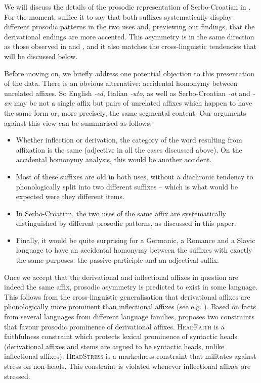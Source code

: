 \documentclass[output=paper]{langsci/langscibook}
\begin{document}
\noindent We will discuss the details of the prosodic representation of Serbo-Croatian in  . For the moment, suffice it to say that both suffixes systematically display different prosodic patterns in the two uses and, previewing our findings, that the derivational endings are more accented. This asymmetry is in the same direction as those observed in \citet{Mar2002} and \citet{Arsim2013}, and it also matches the cross-linguistic tendencies that will be discussed below.

Before moving on, we briefly address one potential objection to this presentation of the data. There is an obvious alternative: accidental homonymy between unrelated affixes. So English \textit{-ed}, Italian \textit{-uto}, as well as Serbo-Croatian \textit{-at} and \textit{-an} may be not a single affix but pairs of unrelated affixes which happen to have the same form or, more precisely, the same segmental content. Our arguments against this view can be summarised as follows: 
\begin{itemize}
  \item Whether inflection or derivation, the category of the word resulting from affixation is the same (adjective in all the cases discussed above). On the accidental homonymy analysis, this would be another accident.
  \item Most of these suffixes are old in both uses, without a diachronic tendency to phonologically split into two different suffixes – which is what would be expected were they different items. 
  \item In Serbo-Croatian, the two uses of the same affix are systematically distinguished by different prosodic patterns, as discussed in this paper.
  \item Finally, it would be quite surprising for a Germanic, a Romance and a Slavic language to have an accidental homonymy between the suffixes with exactly the same purposes: the passive participle and an adjectival suffix. 
  \end{itemize}
  
Once we accept that the derivational and inflectional affixes in question are indeed the same affix, prosodic asymmetry is predicted to exist in some language. This follows from the cross-linguistic generalisation that derivational affixes are phonologically more prominent than inflectional affixes (see e.g. \citealt{Bec1997, Revithiadou1999}). Based on facts from several languages from different language families, \citet{Revithiadou1999} proposes two constraints that favour prosodic prominence of derivational affixes. \textsc{HeadFaith} is a faithfulness constraint which protects lexical prominence of syntactic heads (derivational affixes and stems are argued to be syntactic heads, unlike inflectional affixes). \textsc{HeadStress} is a markedness constraint that militates against stress on non-heads. This constraint is violated whenever inflectional affixes are stressed.
\end{document}
